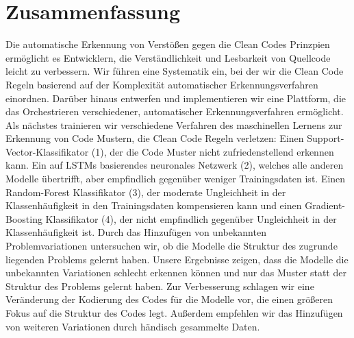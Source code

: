 \section*{Zusammenfassung}

Die automatische Erkennung von Verstößen gegen die Clean Codes Prinzpien ermöglicht es Entwicklern, die Verständlichkeit und Lesbarkeit von Quellcode leicht zu verbessern. Wir führen eine Systematik ein, bei der wir die Clean Code Regeln basierend auf der Komplexität automatischer Erkennungsverfahren einordnen. Darüber hinaus entwerfen und implementieren wir eine Plattform, die das Orchestrieren verschiedener, automatischer Erkennungsverfahren ermöglicht. Als nächstes trainieren wir verschiedene Verfahren des maschinellen Lernens zur Erkennung von Code Mustern, die Clean Code Regeln verletzen: Einen Support-Vector-Klassifikator (1), der die Code Muster nicht zufriedenstellend erkennen kann. Ein auf LSTMs basierendes neuronales Netzwerk (2), welches alle anderen Modelle übertrifft, aber empfindlich gegenüber weniger Trainingsdaten ist. Einen Random-Forest Klassifikator (3), der moderate Ungleichheit in der Klassenhäufigkeit in den Trainingsdaten kompensieren kann und einen Gradient-Boosting Klassifikator (4), der nicht empfindlich gegenüber Ungleichheit in der Klassenhäufigkeit ist. Durch das Hinzufügen von unbekannten Problemvariationen untersuchen wir, ob die Modelle die Struktur des zugrunde liegenden Problems gelernt haben. Unsere Ergebnisse zeigen, dass die Modelle die unbekannten Variationen schlecht erkennen können und nur das Muster statt der Struktur des Problems gelernt haben. Zur Verbesserung schlagen wir eine Veränderung der Kodierung des Codes für die Modelle vor, die einen größeren Fokus auf die Struktur des Codes legt. Außerdem empfehlen wir das Hinzufügen von weiteren Variationen durch händisch gesammelte Daten.
 
\newpage
